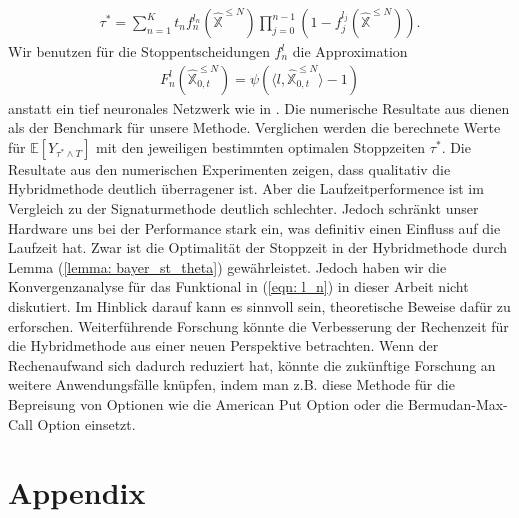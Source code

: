 \documentclass[12pt,titlepage,headsepline]{article}
\begin{document}
      \begin{align*}
        \tau^* = \sum_{n=1}^K t_nf_n^{l_n}(\hat{\mathbb{X}}^{\leq N})\prod_{j=0}^{n-1}(1-f_j^{l_j}(\hat{\mathbb{X}}^{\leq N})).
      \end{align*}
      Wir benutzen für die Stoppentscheidungen $f_n^l$ die Approximation
      \begin{align*}
        F_n^l(\hat{\mathbb{X}}_{0,t}^{\leq N}) = \psi(\langle l, \hat{\mathbb{X}}_{0,t}^{\leq N} \rangle - 1)
      \end{align*}
      anstatt ein tief neuronales Netzwerk wie in \cite{becker_deep_2019}.
      \hfill\break
      Die numerische Resultate aus \cite{becker_deep_2019} dienen als der Benchmark für unsere Methode. Verglichen werden die berechnete Werte für $\mathbb{E}[Y_{\tau^* \wedge T}]$ mit den jeweiligen bestimmten optimalen Stoppzeiten $\tau^*$. Die Resultate aus den numerischen Experimenten zeigen, dass qualitativ die Hybridmethode deutlich überragener ist. Aber die Laufzeitperformence ist im Vergleich zu der Signaturmethode deutlich schlechter. Jedoch schränkt unser Hardware uns bei der Performance stark ein, was definitiv einen Einfluss auf die Laufzeit hat.
      \hfill\break
      Zwar ist die Optimalität der Stoppzeit in der Hybridmethode durch Lemma (\ref{lemma: bayer_st_theta}) gewährleistet. Jedoch haben wir die Konvergenzanalyse für das Funktional in (\ref{eqn: l_n}) in dieser Arbeit nicht diskutiert. Im Hinblick darauf kann es sinnvoll sein, theoretische Beweise dafür zu erforschen. Weiterführende Forschung könnte die Verbesserung der Rechenzeit für die Hybridmethode aus einer neuen Perspektive betrachten. Wenn der Rechenaufwand sich dadurch reduziert hat, könnte die zukünftige Forschung an weitere Anwendungsfälle knüpfen, indem man z.B. diese Methode für die Bepreisung von Optionen wie die American Put Option oder die Bermudan-Max-Call Option einsetzt.
    \printbibliography

    \newpage

    \appendix

    \section{Appendix}
\end{document}
